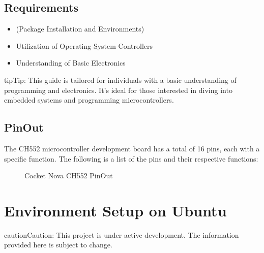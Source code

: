 \documentclass[letterpaper,10pt,english]{sphinxmanual}
\begin{document}
\section{Requirements}
\label{\detokenize{about:requirements}}\begin{itemize}
\item {} 
\sphinxAtStartPar
{}  (Package Installation and Environments)

\item {} 
\sphinxAtStartPar
Utilization of Operating System Controllers

\item {} 
\sphinxAtStartPar
Understanding of Basic Electronics

\end{itemize}

\begin{sphinxadmonition}{tip}{Tip:}
\sphinxAtStartPar
This  guide is tailored for individuals with a basic understanding of programming and electronics. It’s ideal for those interested in diving into embedded systems and programming microcontrollers.
\end{sphinxadmonition}


\section{PinOut}
\label{\detokenize{about:pinout}}
\sphinxAtStartPar
The CH552 microcontroller development board has a total of 16 pins, each with a specific function. The following is a list of the pins and their respective functions:

\begin{figure}[htbp]
\centering
\capstart

\noindent{}
\caption{Cocket Nova CH552 PinOut}\label{\detokenize{about:id2}}\label{\detokenize{about:id1}}\end{figure}

\sphinxstepscope


\chapter{Environment Setup on Ubuntu}
\label{\detokenize{install_linux:environment-setup-on-ubuntu}}\label{\detokenize{install_linux::doc}}
\begin{sphinxadmonition}{caution}{Caution:}
\sphinxAtStartPar
This project is under active development. The information provided here is subject to change.
\end{sphinxadmonition}
\end{document}
